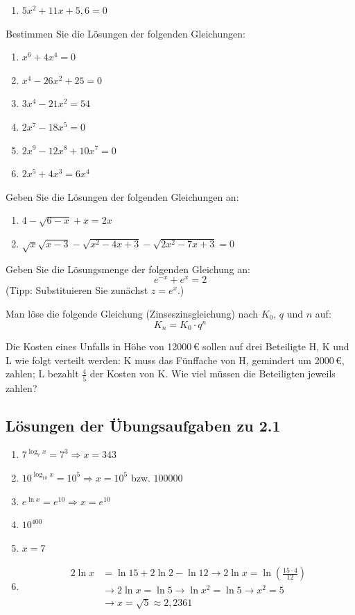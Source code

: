 \begin{uebungsaufgaben}
\begin{enumerate}[label=\alph*)]
      \item $5x^2 + 11x + 5{,}6 = 0$
    \end{enumerate}
  \item Bestimmen Sie die Lösungen der folgenden Gleichungen:
    \begin{enumerate}[label=\alph*)]
      \item $x^6 + 4x^4 = 0$
      \item $x^4 - 26x^2 + 25 = 0$
      \item $3x^4 - 21x^2 = 54$
      \item $2x^7 - 18x^5 = 0$
      \item $2x^9 - 12x^8 + 10x^7 = 0$
      \item $2x^5 + 4x^3 = 6x^4$
    \end{enumerate}
  \item Geben Sie die Lösungen der folgenden Gleichungen an:
    \begin{enumerate}[label=\alph*)]
      \item $4 - \sqrt{6 - x} + x = 2x$
      \item $\sqrt{x}\sqrt{x-3} - \sqrt{x^2 - 4x + 3} - \sqrt{2x^2 - 7x + 3} = 0$
    \end{enumerate}
  \item Geben Sie die Lösungsmenge der folgenden Gleichung an:
    \[ e^{-x} + e^{x} = 2 \]
    (Tipp: Substituieren Sie zunächst $z = e^x$.)
  \item Man löse die folgende Gleichung (Zinseszinsgleichung) nach $K_0$, $q$ und $n$ auf:
    \[ K_n = K_0 \cdot q^n \]
  \item Die Kosten eines Unfalls in Höhe von 12000\,€ sollen auf drei Beteiligte H, K und L wie folgt verteilt werden: K muss das Fünffache von H, gemindert um 2000\,€, zahlen; L bezahlt $\tfrac{4}{5}$ der Kosten von K. Wie viel müssen die Beteiligten jeweils zahlen?
\end{uebungsaufgaben}

\subsection{Lösungen der Übungsaufgaben zu 2.1}

\begin{enumerate}[label=\alph*)]
  \item $7^{\log_7 x} = 7^3 \Rightarrow x = 343$
  \item $10^{\log_{10} x} = 10^5 \Rightarrow x = 10^5$ bzw. $100000$
  \item $e^{\ln x} = e^{10} \Rightarrow x = e^{10}$
  \item $10^{400}$
  \item $x = 7$
  \item \begin{align*}
      2\ln x &= \ln 15 + 2\ln 2 - \ln 12 \rightarrow 2\ln x = \ln\left(\frac{15 \cdot 4}{12}\right)\\
      &\rightarrow 2\ln x = \ln 5 \rightarrow \ln x^2 = \ln 5 \rightarrow x^2 = 5\\
      &\rightarrow x = \sqrt{5} \approx 2{,}2361
    \end{align*}
\end{enumerate}

